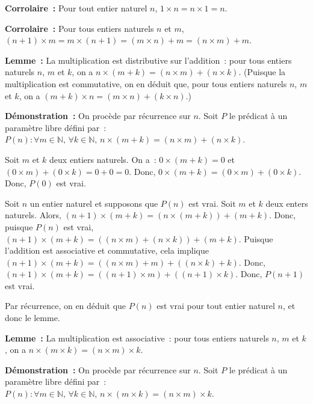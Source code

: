 \medskip

\noindent\textbf{Corrolaire :} Pour tout entier naturel $n$, $1 \times n = n \times 1 = n$. 

\medskip

\noindent\textbf{Corrolaire :} Pour tous entiers naturels $n$ et $m$, $(n+1) \times m = m \times (n+1) = (m \times n) + m = (n \times m) + m$. 

\medskip

\noindent\textbf{Lemme :} La multiplication est distributive sur l'addition : pour tous entiers naturels $n$, $m$ et $k$, on a $n \times (m + k) = (n \times m) + (n \times k)$.
    (Puisque la multiplication est commutative, on en déduit que, pour tous entiers naturels $n$, $m$ et $k$, on a $(m + k) \times n = (m \times n) + (k \times n)$.)

\medskip

\noindent\textbf{Démonstration :} On procède par récurrence sur $n$. 
    Soit $P$ le prédicat à un paramètre libre défini par : $P(n): \forall m \in \mathbb{N}, \, \forall k \in \mathbb{N}, \, n \times (m + k) = (n \times m) + (n \times k)$.

    Soit $m$ et $k$ deux entiers naturels. 
    On a : $0 \times (m+k) = 0$ et $(0 \times m) + (0 \times k) = 0 + 0 = 0$. 
    Donc, $0 \times (m+k) = (0 \times m) + (0 \times k)$. 
    Donc, $P(0)$ est vrai. 

    Soit $n$ un entier naturel et supposons que $P(n)$ est vrai. 
    Soit $m$ et $k$ deux enters naturels. 
    Alors, $(n+1) \times (m + k) = (n \times (m + k)) + (m + k)$. 
    Donc, puisque $P(n)$ est vrai, $(n+1) \times (m + k) = ((n \times m) + (n \times k)) + (m + k)$. 
    Puisque l'addition est associative et commutative, cela implique $(n+1) \times (m + k) = ((n \times m) + m) + ((n \times k) + k)$. 
    Donc, $(n+1) \times (m + k) = ((n+1) \times m) + ((n+1) \times k)$. 
    Donc, $P(n+1)$ est vrai. 

    Par récurrence, on en déduit que $P(n)$ est vrai pour tout entier naturel $n$, et donc le lemme.

   \done 

\medskip

\noindent\textbf{Lemme :} La multiplication est associative : pour tous entiers naturels $n$, $m$ et $k$, on a $n \times (m \times k) = (n \times m) \times k$.

\medskip

\noindent\textbf{Démonstration :} On procède par récurrence sur $n$. 
    Soit $P$ le prédicat à un paramètre libre défini par : $P(n): \forall m \in \mathbb{N}, \, \forall k \in \mathbb{N}, \, n \times (m \times k) = (n \times m) \times k$.


